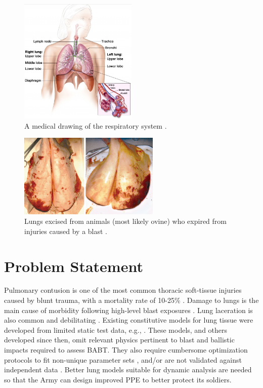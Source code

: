 \begin{figure}
    \centering\includegraphics[width=0.5\textwidth]{figures/theRespiratorySystem.png}
    \caption{A medical drawing of the respiratory system \cite{Josey10}.}
    \label{figLungDrawing}
\end{figure}

\begin{figure}
    \centering\includegraphics[width=0.6\textwidth]{figures/lungInjuryResultingFromBlast.png}
    \caption{Lungs excised from animals (most likely ovine) who expired from injuries caused by a blast \cite{Stuhmiller08}.}
    \label{figDamagedLung}
\end{figure}

\section{Problem Statement}

Pulmonary contusion is one of the most common thoracic soft-tissue injuries caused by blunt trauma, with a mortality rate of 10-25\% \citep{Stitzeletal05}.  Damage to lungs is the main cause of morbidity following high-level blast exposures \citep{Stuhmilleretal88}.  Lung laceration is also common and debilitating \citep{VlessisTrunkey97}.  Existing constitutive models for lung tissue were developed from limited static test data, e.g., \cite{Fungetal78,Vawteretal79,Vawter80}.  These models, and others developed since then, omit relevant physics pertinent to blast and ballistic impacts required to assess BABT.  They also require cumbersome optimization protocols to fit non-unique parameter sets \citep{Gayziketal07,Gayziketal11}, and\slash or are not validated against independent data \citep{Yuenetal08}.  Better lung models suitable for dynamic analysis are needed so that the Army can design improved PPE to better protect its soldiers.

